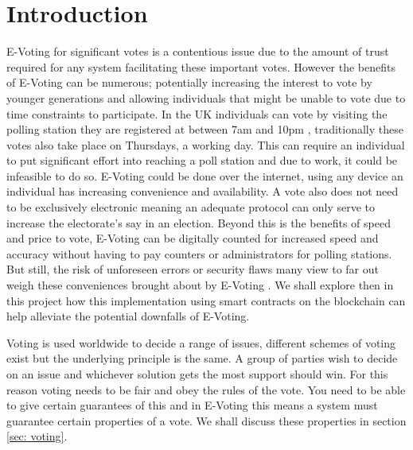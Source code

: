 \documentclass{entcs}
\begin{document}
\section{Introduction}
E-Voting for significant votes is a contentious issue due to the amount of trust required for any system facilitating these important votes. However the benefits of E-Voting can be numerous; potentially increasing the interest to vote by younger generations and allowing individuals that might be unable to vote due to time constraints to participate. In the UK individuals can vote by visiting the polling station they are registered at between 7am and 10pm \cite{pollStations}, traditionally these votes also take place on Thursdays, a working day. This can require an individual to put significant effort into reaching a poll station and due to work, it could be infeasible to do so. E-Voting could be done over the internet, using any device an individual has increasing convenience and availability. A vote also does not need to be exclusively electronic meaning an adequate protocol can only serve to increase the electorate's say in an election. Beyond this is the benefits of speed and price to vote, E-Voting can be digitally counted for increased speed and accuracy without having to pay counters or administrators for polling stations. But still, the risk of unforeseen errors or security flaws many view to far out weigh these conveniences brought about by E-Voting \cite{lauer2004risk}. We shall explore then in this project how this implementation using smart contracts on the blockchain can help alleviate the potential downfalls of E-Voting.

Voting is used worldwide to decide a range of issues, different schemes of voting exist but the underlying principle is the same. A group of parties wish to decide on an issue and whichever solution gets the most support should win. For this reason voting needs to be fair and obey the rules of the vote. You need to be able to give certain guarantees of this and in E-Voting this means a system must guarantee certain properties of a vote. We shall discuss these properties in section \ref{sec: voting}.
\end{document}
